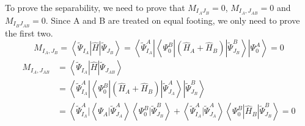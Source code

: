 To prove the separability, we need to prove that $M_{I_A J_B}=0$, $M_{I_A, J_{AB}}=0$ and $M_{I_B J_{AB}}=0$.
Since A and B are treated on equal footing, we only need to prove the first two.
\begin{equation}
	M_{I_{A}, J_{B}}=\left\langle\tilde{\Psi}_{I_{A}}|\hat{H}| \tilde{\Psi}_{J_{B}}\right\rangle=\left\langle\tilde{\Psi}_{I_{A}}^{A}\left|\left\langle\Psi_{0}^{B}\left|\left(\hat{H}_{A}+\hat{H}_{B}\right)\right| \tilde{\Psi}_{J_{B}}^{B}\right\rangle\right| \Psi_{0}^{A}\right\rangle= 0
\end{equation}
\begin{equation}
	\begin{aligned} M_{I_{A}, J_{A B}} &=\left\langle\tilde{\Psi}_{I_{A}}|\hat{H}| \tilde{\Psi}_{J_{A B}}\right\rangle \\ &=\left\langle\tilde{\Psi}_{I_{A}}^{A}\left|\left\langle\Psi_{0}^{B}\left|\left(\hat{H}_{A}+\hat{H}_{B}\right)\right| \tilde{\Psi}_{J_{A}}^{A}\right\rangle\right| \tilde{\Psi}_{J_{B}}^{B}\right\rangle \\ &=\left\langle\tilde{\Psi}_{I_{\Lambda}}^{A} |\left\langle\Psi_{A} | \tilde{\Psi}_{J_{A}}^{A}\right\rangle\left\langle\Psi_{0}^{B} | \tilde{\Psi}_{J_{B}}^{B}\right\rangle+\left\langle\tilde{\Psi}_{I_{A}}^{A} | \tilde{\Psi}_{J_{A}}^{A}\right\rangle\left\langle\Psi_{0}^{B}\left|\hat{H}_{B}\right| \tilde{\Psi}_{J_{B}}^{B}\right\rangle= 0\right.\end{aligned}
\end{equation}

